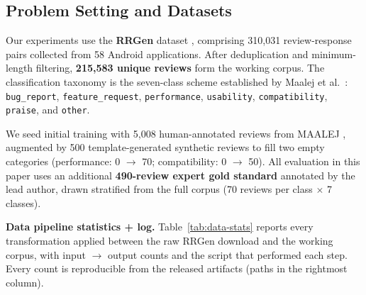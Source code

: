 \documentclass[sigconf, nonacm, anonymous, balance=false]{acmart}
\begin{document}
\subsection{Problem Setting and Datasets}\label{problem-setting-and-datasets}

Our experiments use the \textbf{RRGen} dataset \cite{gao2019rrgen}, comprising 310,031 review-response pairs collected from 58 Android applications. After deduplication and minimum-length filtering, \textbf{215,583 unique reviews} form the working corpus. The classification taxonomy is the seven-class scheme established by Maalej et al.~\cite{maalej2016}: \texttt{bug\_report}, \texttt{feature\_request}, \texttt{performance}, \texttt{usability}, \texttt{compatibility}, \texttt{praise}, and \texttt{other}.

We seed initial training with 5,008 human-annotated reviews from MAALEJ \cite{maalej2016}, augmented by 500 template-generated synthetic reviews to fill two empty categories (performance: 0 $\rightarrow$ 70; compatibility: 0 $\rightarrow$ 50). All evaluation in this paper uses an additional \textbf{490-review expert gold standard} annotated by the lead author, drawn stratified from the full corpus (70 reviews per class $\times$ 7 classes).

\textbf{Data pipeline statistics + log.} Table~\ref{tab:data-stats} reports every transformation applied between the raw RRGen download and the working corpus, with input $\to$ output counts and the script that performed each step. Every count is reproducible from the released artifacts (paths in the rightmost column).
\end{document}
